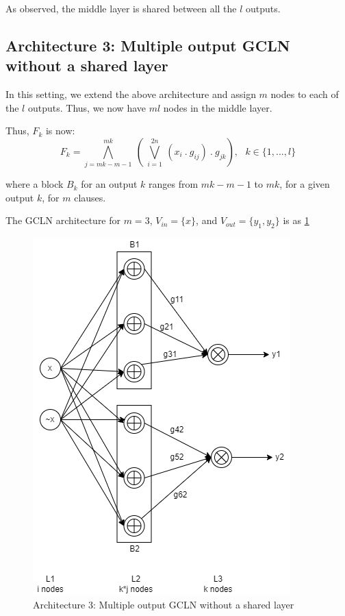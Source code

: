 As observed,  the middle layer is shared between all the $l$ outputs.
\subsection{Architecture 3: Multiple output GCLN without a shared layer}

In this setting, we extend the above architecture and assign $m$ nodes to each of the $l$ outputs. Thus, we now have $ml$ nodes in the middle layer.

Thus, $F_k$ is now:
\[ F_k = \bigwedge_{j = mk-m-1}^{mk} \ (\  \bigvee_{i=1}^{2n}\  (x_i\ .\ g_{ij})\ .\ g_{jk}), \ \ \ k \in \{1, ..., l\}\]

where a block $B_k$ for an output $k$ ranges from $mk-m-1$ to $mk$, for a given output $k$, for $m$ clauses.

The GCLN architecture for $m = 3$,  $V_{in} = \{ x\}$, and $V_{out} = \{ y_1, y_2\}$ is as \ref{fig:arch3} \\

\begin{figure}[t]
	\centering
    \includegraphics[scale=0.5]{architecture-3.png}
    \caption{Architecture 3: Multiple output GCLN without a shared layer}
    \label{fig:arch3}
\end{figure}

